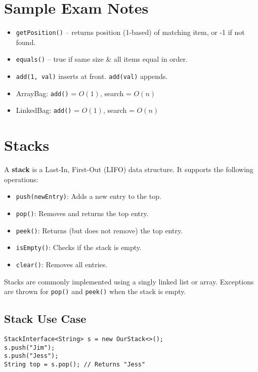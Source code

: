 \documentclass[11pt]{article}
\begin{document}
\section*{Sample Exam Notes}
\begin{itemize}[leftmargin=*]
\item \texttt{getPosition()} – returns position (1-based) of matching item, or -1 if not found.
\item \texttt{equals()} – true if same size \& all items equal in order.
\item \texttt{add(1, val)} inserts at front. \texttt{add(val)} appends.
\item ArrayBag: \texttt{add()} = $O(1)$, search = $O(n)$
\item LinkedBag: \texttt{add()} = $O(1)$, search = $O(n)$
\end{itemize}




\newpage
\section*{Stacks}

A \textbf{stack} is a Last-In, First-Out (LIFO) data structure. It supports the following operations:

\begin{itemize}
  \item \texttt{push(newEntry)}: Adds a new entry to the top.
  \item \texttt{pop()}: Removes and returns the top entry.
  \item \texttt{peek()}: Returns (but does not remove) the top entry.
  \item \texttt{isEmpty()}: Checks if the stack is empty.
  \item \texttt{clear()}: Removes all entries.
\end{itemize}

Stacks are commonly implemented using a singly linked list or array. Exceptions are thrown for \texttt{pop()} and \texttt{peek()} when the stack is empty.

\subsection*{Stack Use Case}
\begin{verbatim}
StackInterface<String> s = new OurStack<>();
s.push("Jim");
s.push("Jess");
String top = s.pop(); // Returns "Jess"
\end{verbatim}
\end{document}
